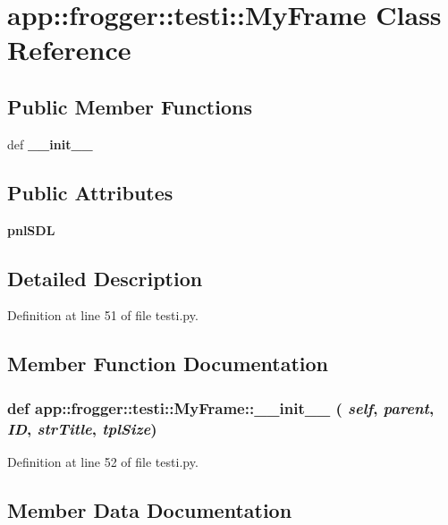 \section{app::frogger::testi::MyFrame Class Reference}
\label{classapp_1_1frogger_1_1testi_1_1MyFrame}
\subsection*{Public Member Functions}
\begin{CompactItemize}
\item 
def {\bf \_\-\_\-init\_\-\_\-}
\end{CompactItemize}
\subsection*{Public Attributes}
\begin{CompactItemize}
\item 
{\bf pnlSDL}
\end{CompactItemize}


\subsection{Detailed Description}


Definition at line 51 of file testi.py.

\subsection{Member Function Documentation}
\subsubsection{\setlength{\rightskip}{0pt plus 5cm}def app::frogger::testi::MyFrame::\_\-\_\-init\_\-\_\- ( {\em self},  {\em parent},  {\em ID},  {\em strTitle},  {\em tplSize})}\label{classapp_1_1frogger_1_1testi_1_1MyFrame_80dc1597e3ac78d99f790648242a334f}




Definition at line 52 of file testi.py.

\subsection{Member Data Documentation}
